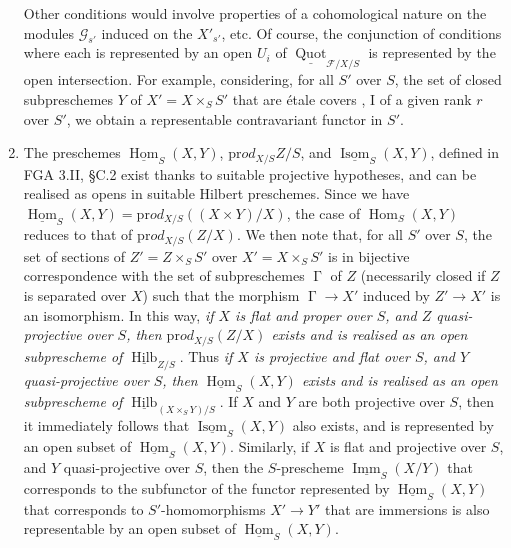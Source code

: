 \begin{enumerate}[label=\alph*.]
\begin{enumerate}
        \end{enumerate}
        Other conditions would involve properties of a cohomological nature on the modules $\mathcal{G}_{s'}$ induced on the $X'_{s'}$, etc.
        Of course, the conjunction of conditions where each is represented by an open $U_i$ of $\underline{\operatorname{Quot}}_{\mathcal{F}/X/S}$ is represented by the open intersection.
        For example, considering, for all $S'$ over $S$, the set of closed subpreschemes $Y$ of $X'=X\times_S S'$ that are étale covers \cite{Gro1960b}, I of a given rank $r$ over $S'$, we obtain a representable contravariant functor in $S'$.
  \item The preschemes $\underline{\operatorname{Hom}}_S(X,Y)$, $\mathrm{pr}od_{X/S}Z/S$, and $\underline{\operatorname{Isom}}_S(X,Y)$, defined in FGA 3.II, §C.2  exist thanks to suitable projective hypotheses, and can be realised as opens in suitable Hilbert preschemes.
        Since we have $\underline{\operatorname{Hom}}_S(X,Y)=\mathrm{pr}od_{X/S}((X\times Y)/X)$, the case of $\operatorname{Hom}_S(X,Y)$ reduces to that of $\mathrm{pr}od_{X/S}(Z/X)$.
        We then note that, for all $S'$ over $S$, the set of sections of $Z'=Z\times_S S'$ over $X'=X\times_S S'$ is in bijective correspondence with the set of subpreschemes $\operatorname{\Gamma}$ of $Z$ (necessarily closed if $Z$ is separated over $X$) such that the morphism $\operatorname{\Gamma}\to X'$ induced by $Z'\to X'$ is an isomorphism.
        In this way, \emph{if $X$ is flat and proper over $S$, and $Z$ quasi-projective over $S$, then $\mathrm{pr}od_{X/S}(Z/X)$ exists and is realised as an open subprescheme of $\underline{\operatorname{Hilb}}_{Z/S}$}.
        Thus \emph{if $X$ is projective and flat over $S$, and $Y$ quasi-projective over $S$, then $\underline{\operatorname{Hom}}_S(X,Y)$ exists and is realised as an open subprescheme of $\underline{\operatorname{Hilb}}_{(X\times_S Y)/S}$}.
        If $X$ and $Y$ are both projective over $S$, then it immediately follows that $\underline{\operatorname{Isom}}_S(X,Y)$ also exists, and is represented by an open subset of $\underline{\operatorname{Hom}}_S(X,Y)$.
        Similarly, if $X$ is flat and projective over $S$, and $Y$ quasi-projective over $S$, then the $S$-prescheme $\underline{\operatorname{Imm}}_S(X/Y)$ that corresponds to the subfunctor of the functor represented by $\underline{\operatorname{Hom}}_S(X,Y)$ that corresponds to $S'$-homomorphisms $X'\to Y'$ that are immersions is also representable by an open subset of $\underline{\operatorname{Hom}}_S(X,Y)$.


\end{enumerate}
